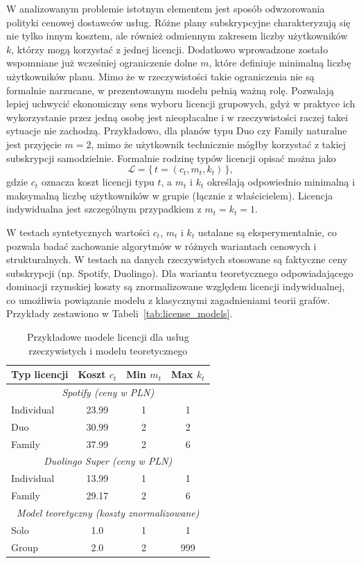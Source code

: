 W analizowanym problemie istotnym elementem jest sposób odwzorowania polityki cenowej dostawców usług. Różne plany subskrypcyjne charakteryzują się nie tylko innym kosztem, ale również odmiennym zakresem liczby użytkowników $k$, którzy mogą korzystać z jednej licencji. Dodatkowo wprowadzone zostało wspomniane już wcześniej ograniczenie dolne $m$, które definiuje minimalną liczbę użytkowników planu. Mimo że w rzeczywistości takie ograniczenia nie są formalnie narzucane, w prezentowanym modelu pełnią ważną rolę. Pozwalają lepiej uchwycić ekonomiczny sens wyboru licencji grupowych, gdyż w praktyce ich wykorzystanie przez jedną osobę jest nieopłacalne i w rzeczywistości raczej takei sytuacje nie zachodzą. Przykładowo, dla planów typu Duo czy Family naturalne jest przyjęcie $m=2$, mimo że użytkownik technicznie mógłby korzystać z takiej subskrypcji samodzielnie. Formalnie rodzinę typów licencji opisać można jako
\[
\mathcal{L} = \{\, t = (c_t, m_t, k_t) \,\},
\]
gdzie $c_t$ oznacza koszt licencji typu $t$, a $m_t$ i $k_t$ określają odpowiednio minimalną i maksymalną liczbę użytkowników w grupie (łącznie z właścicielem). Licencja indywidualna jest szczególnym przypadkiem z $m_t = k_t = 1$.

W testach syntetycznych wartości $c_t$, $m_t$ i $k_t$ ustalane są eksperymentalnie, co pozwala badać zachowanie algorytmów w różnych wariantach cenowych i strukturalnych. W testach na danych rzeczywistych stosowane są faktyczne ceny subskrypcji (np. Spotify, Duolingo). Dla wariantu teoretycznego odpowiadającego dominacji rzymskiej koszty są znormalizowane względem licencji indywidualnej, co umożliwia powiązanie modelu z klasycznymi zagadnieniami teorii grafów. Przykłady zestawiono w Tabeli~\ref{tab:license_models}.

\begin{table}[h!]
\centering
\caption{Przykładowe modele licencji dla usług rzeczywistych i modelu teoretycznego}
\label{tab:license_models_real}
\begin{tabular}{lccc}
\hline
\textbf{Typ licencji} & \textbf{Koszt $c_t$} & \textbf{Min $m_t$} & \textbf{Max $k_t$} \\
\hline
\multicolumn{4}{c}{\textit{Spotify (ceny w PLN)}} \\
Individual & 23.99 & 1 & 1 \\
Duo        & 30.99 & 2 & 2 \\
Family     & 37.99 & 2 & 6 \\
\hline
\multicolumn{4}{c}{\textit{Duolingo Super (ceny w PLN)}} \\
Individual & 13.99 & 1 & 1 \\
Family     & 29.17 & 2 & 6 \\
\hline
\multicolumn{4}{c}{\textit{Model teoretyczny (koszty znormalizowane)}} \\
Solo       & 1.0   & 1 & 1 \\
Group      & 2.0   & 2 & 999 \\
\hline
\end{tabular}
\end{table}


